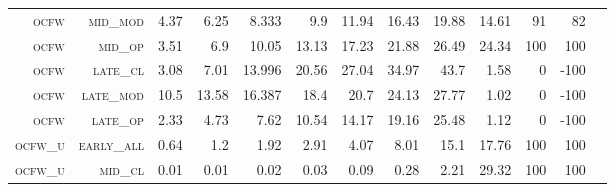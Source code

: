 \begin{landscape}
\begin{table}[!htbp]
\begin{tabular}{@{}rrrrrrrrrr|rrr@{}}
\footnotesize \textsc{ocfw}        & \footnotesize \textsc{mid\_mod  }                & \footnotesize 4.37          & \footnotesize 6.25           & \footnotesize 8.333            & \footnotesize 9.9             & \footnotesize 11.94           & \footnotesize 16.43           & \footnotesize 19.88      & \footnotesize 14.61    & \footnotesize 91     & \footnotesize 82    \\
\footnotesize \textsc{ocfw}        & \footnotesize \textsc{mid\_op   }                & \footnotesize 3.51          & \footnotesize 6.9            & \footnotesize 10.05            & \footnotesize 13.13           & \footnotesize 17.23           & \footnotesize 21.88           & \footnotesize 26.49      & \footnotesize 24.34    & \footnotesize 100    & \footnotesize 100    \\
\footnotesize \textsc{ocfw}        & \footnotesize \textsc{late\_cl  }                & \footnotesize 3.08          & \footnotesize 7.01           & \footnotesize 13.996           & \footnotesize 20.56           & \footnotesize 27.04           & \footnotesize 34.97           & \footnotesize 43.7       & \footnotesize 1.58     & \footnotesize 0      & \footnotesize -100    \\
\footnotesize \textsc{ocfw}        & \footnotesize \textsc{late\_mod }                & \footnotesize 10.5          & \footnotesize 13.58          & \footnotesize 16.387           & \footnotesize 18.4            & \footnotesize 20.7            & \footnotesize 24.13           & \footnotesize 27.77      & \footnotesize 1.02     & \footnotesize 0      & \footnotesize -100    \\
\footnotesize \textsc{ocfw}        & \footnotesize \textsc{late\_op  }                & \footnotesize 2.33          & \footnotesize 4.73           & \footnotesize 7.62             & \footnotesize 10.54           & \footnotesize 14.17           & \footnotesize 19.16           & \footnotesize 25.48      & \footnotesize 1.12     & \footnotesize 0      & \footnotesize -100    \\
\footnotesize \textsc{ocfw\_u}     & \footnotesize \textsc{early\_all}                & \footnotesize 0.64          & \footnotesize 1.2            & \footnotesize 1.92             & \footnotesize 2.91            & \footnotesize 4.07            & \footnotesize 8.01            & \footnotesize 15.1       & \footnotesize 17.76    & \footnotesize 100    & \footnotesize 100    \\
\footnotesize \textsc{ocfw\_u}     & \footnotesize \textsc{mid\_cl   }                & \footnotesize 0.01          & \footnotesize 0.01           & \footnotesize 0.02             & \footnotesize 0.03            & \footnotesize 0.09            & \footnotesize 0.28            & \footnotesize 2.21       & \footnotesize 29.32    & \footnotesize 100    & \footnotesize 100    \\

\end{tabular}
\end{table}
\end{landscape}
